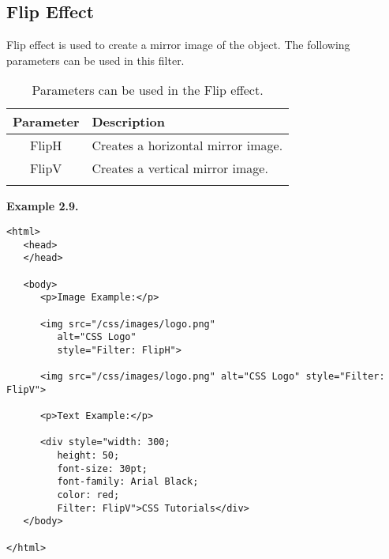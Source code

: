 \documentclass[a4paper,oneside]{book}
\numberwithin{equation}{chapter}
\begin{document}
\subsection{Flip Effect}
Flip effect is used to create a mirror image of the object. The following parameters can be used in this filter.
\begin{center}
\begin{longtable}{|c|l|}
\hline
\textbf{Parameter} & \textbf{Description}\\
\hline
FlipH & Creates a horizontal mirror image.\\
\hline
FlipV & Creates a vertical mirror image.\\
\hline
\caption{Parameters can be used in the Flip effect.}
\end{longtable}
\end{center}
\textbf{Example 2.9.} 
\begin{verbatim}
<html>
   <head>
   </head>
   
   <body>
      <p>Image Example:</p>
      
      <img src="/css/images/logo.png" 
         alt="CSS Logo" 
         style="Filter: FlipH">
      
      <img src="/css/images/logo.png" alt="CSS Logo" style="Filter: FlipV">
      
      <p>Text Example:</p>
      
      <div style="width: 300; 
         height: 50; 
         font-size: 30pt; 
         font-family: Arial Black; 
         color: red; 
         Filter: FlipV">CSS Tutorials</div>
   </body>
   
</html>
\end{verbatim}
\end{document}
